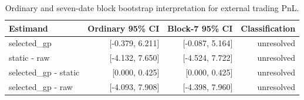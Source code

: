\begin{table}[htbp]
\centering
\caption{Ordinary and seven-date block bootstrap interpretation for external trading PnL.}
\label{tab:trading-bootstrap}
\begin{tabular}{lrrr}
\toprule
Estimand & Ordinary 95\% CI & Block-7 95\% CI & Classification \\
\midrule
selected\_gp & [-0.379, 6.211] & [-0.087, 5.164] & unresolved \\
static - raw & [-4.132, 7.650] & [-4.524, 7.722] & unresolved \\
selected\_gp - static & [0.000, 0.425] & [0.000, 0.425] & unresolved \\
selected\_gp - raw & [-4.093, 7.908] & [-4.398, 7.960] & unresolved \\
\bottomrule
\end{tabular}
\end{table}
